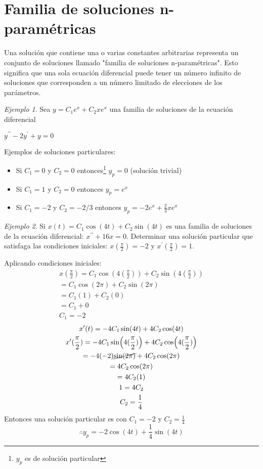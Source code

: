 \documentclass[12pt]{article} %
\theoremstyle{remark} %
\newtheorem{ejemplo}{Ejemplo}[section]
\newcommand{\ed}{ecuación diferencial}
\begin{document}
\section{Familia de soluciones n-paramétricas}
Una solución que contiene una o varias constantes arbitrarias representa un conjunto de soluciones
llamado "familia de soluciones n-paramétricas". Esto significa que una sola
ecuación diferencial puede tener un número infinito de soluciones que
corresponden a un número limitado de elecciones de los parámetros.
\begin{ejemplo}
  Sea $y = C_1e^x + C_2xe^x$ una familia de soluciones de la \ed 
 
  $y^{\prime \prime} - 2y^{\prime} + y = 0$

  Ejemplos de soluciones particulares:
  \begin{itemize}
    \item Si $C_1 = 0$ y $C_2 = 0$ entonces\footnote{$y_p$ es de solución particular}
$y_p = 0$ (solución trivial)
    \item Si $C_1 = 1$ y  $C_2 = 0$ entonces $y_p = e^x$
    \item Si $C_1 = -2$ y $C_2 = -2/3$ entonces $y_p = -2e^x + \frac{2}{3} xe^x$
  \end{itemize}
\end{ejemplo}
\begin{ejemplo}
Si $x(t) = C_1 \cos(4t) + C_2 \sin(4t)$ es una familia de soluciones de la \ed :
$x^{\prime \prime} + 16x = 0$. Determinar una solución particular que satisfaga las condiciones iniciales:
$x(\frac{\pi}{2}) = -2$ y $x^{\prime}(\frac{\pi}{2}) = 1$.

Aplicando condiciones iniciales:
\begin{gather*}
  x(\frac{\pi}{2}) = C_1 \cos(4(\frac{\pi}{2})) + C_2 \sin(4(\frac{\pi}{2}))\\
  = C_1 \cos(2 \pi) + C_2 \sin(2 \pi)\\
  = C_1(1) + C_2(0)\\
  =C_1 + 0\\
  C_1 = -2
\end{gather*}
\begin{gather*}
  x^{\prime}(t) = -4 C_1 \sin(4t) + 4 C_2 \cos(4t)\\
  x^{\prime}(\frac{\pi}{2}) = -4 C_1 \sin(4(\frac{\pi}{2})) + 4 C_2 \cos(4(\frac{\pi}{2}))\\
= -4(-2) \cancel{\sin(2 \pi)} + 4 C_2 \cos(2 \pi)\\
= 4 C_2 \cos(2 \pi)\\
= 4 C_2 (1)\\
1 = 4 C_2\\
C_2 = \frac{1}{4}
\end{gather*}
Entonces una solución particular es con $C_1 = -2$ y $C_2 = \frac{1}{4}$
\[ \therefore y_p = -2 \cos(4t) + \frac{1}{4} \sin(4t) \]
\end{ejemplo}
\end{document}
